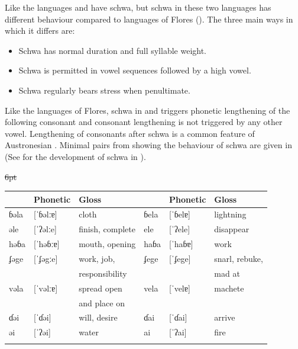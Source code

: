 Like the  languages
 and  have schwa, but schwa in these two languages
has different behaviour compared to
languages of Flores ().
The three main ways in which it differs are:

\begin{itemize}
	\item Schwa has normal duration and full syllable weight.
	\item Schwa is permitted in vowel sequences followed by a high vowel.
	\item Schwa regularly bears stress when penultimate.
\end{itemize}

Like the languages of Flores, schwa in  and 
triggers phonetic lengthening of the following consonant
and consonant lengthening is not triggered by any other vowel.
Lengthening of consonants after schwa is a common feature of Austronesian
\citep{Smith2023}.
Minimal pairs from  showing the
behaviour of schwa are given in 
(See  for the development of schwa in ).

\begin{table}
	\centering{}
	\st{6pt}\begin{tabular}{lll|lll}\lsptoprule
	\ili{Havu}	&	Phonetic&	Gloss										&	\ili{Havu}		&	Phonetic	&	Gloss			\\	\midrule
	ɓəla	&	[ˈɓəlːɐ]	&	cloth									& ɓela		&	[ˈɓelɐ]		&	lightning			\\
	əle		&	[ˈʔəlːe]	&	finish, complete			&	ele			&	[ˈʔele]		&	disappear	\\
	həɓa	&	[ˈhəɓːɐ]	&	mouth, opening				&	haɓa		&	[ˈhaɓɐ]		&	work			\\
	ʄəge	&	[ˈʄəgːe]	&	work, job,						&	ʄege		&	[ˈʄege]		&	snarl, rebuke,	\\
				&						&	responsibility				&					&						&	mad at	\\
	vəla	&	[ˈvəlːɐ]	&	spread open 					&	vela		&	[ˈvelɐ]		&	machete		\\
				&						&	and place on					&					&						&						\\
	ɗəi		&	[ˈɗəi]		&	will, desire					&	ɗai			&	[ˈɗai]		&	arrive		\\
	əi		&	[ˈʔəi]		&	water									&	ai			&	[ˈʔai]		&	fire			\\
		\lspbottomrule
	\end{tabular}
\end{table}

